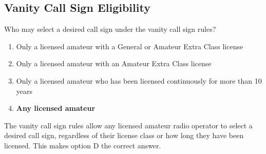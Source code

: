 \subsection{Vanity Call Sign Eligibility}
\label{T1C02}

\begin{tcolorbox}[colback=gray!10!white,colframe=black!75!black,title=T1C02]
Who may select a desired call sign under the vanity call sign rules?
\begin{enumerate}[label=\Alph*,noitemsep]
    \item Only a licensed amateur with a General or Amateur Extra Class license
    \item Only a licensed amateur with an Amateur Extra Class license
    \item Only a licensed amateur who has been licensed continuously for more than 10 years
    \item \textbf{Any licensed amateur}
\end{enumerate}
\end{tcolorbox}

The vanity call sign rules allow any licensed amateur radio operator to select a desired call sign, regardless of their license class or how long they have been licensed. This makes option D the correct answer.